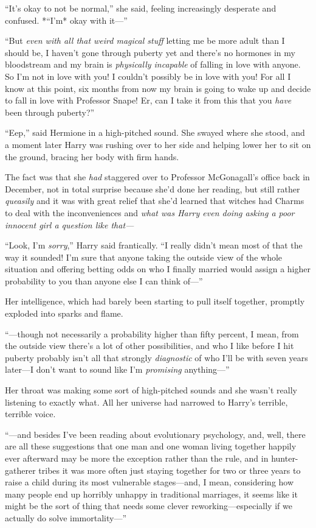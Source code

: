``It's okay to not be normal,'' she said, feeling increasingly desperate
and confused. *``I'm* okay with it---''

``But \emph{even with all that weird magical stuff} letting me be more
adult than I should be, I haven't gone through puberty yet and there's
no hormones in my bloodstream and my brain is \emph{physically
incapable} of falling in love with anyone. So I'm not in love with you!
I couldn't possibly be in love with you! For all I know at this point,
six months from now my brain is going to wake up and decide to fall in
love with Professor Snape! Er, can I take it from this that you
\emph{have} been through puberty?''

``Eep,'' said Hermione in a high-pitched sound. She swayed where she
stood, and a moment later Harry was rushing over to her side and helping
lower her to sit on the ground, bracing her body with firm hands.

The fact was that she \emph{had} staggered over to Professor
McGonagall's office back in December, not in total surprise because
she'd done her reading, but still rather \emph{queasily} and it was with
great relief that she'd learned that witches had Charms to deal with the
inconveniences and \emph{what was Harry even doing asking a poor
innocent girl a question like that---}

``Look, I'm \emph{sorry},'' Harry said frantically. ``I really didn't
mean most of that the way it sounded! I'm sure that anyone taking the
outside view of the whole situation and offering betting odds on who I
finally married would assign a higher probability to you than anyone
else I can think of---''

Her intelligence, which had barely been starting to pull itself
together, promptly exploded into sparks and flame.

``---though not necessarily a probability higher than fifty percent, I
mean, from the outside view there's a lot of other possibilities, and
who I like before I hit puberty probably isn't all that strongly
\emph{diagnostic} of who I'll be with seven years later---I don't want
to sound like I'm \emph{promising} anything---''

Her throat was making some sort of high-pitched sounds and she wasn't
really listening to exactly what. All her universe had narrowed to
Harry's terrible, terrible voice.

``---and besides I've been reading about evolutionary psychology, and,
well, there are all these suggestions that one man and one woman living
together happily ever afterward may be more the exception rather than
the rule, and in hunter-gatherer tribes it was more often just staying
together for two or three years to raise a child during its most
vulnerable stages---and, I mean, considering how many people end up
horribly unhappy in traditional marriages, it seems like it might be the
sort of thing that needs some clever reworking---especially if we
actually do solve immortality---''

